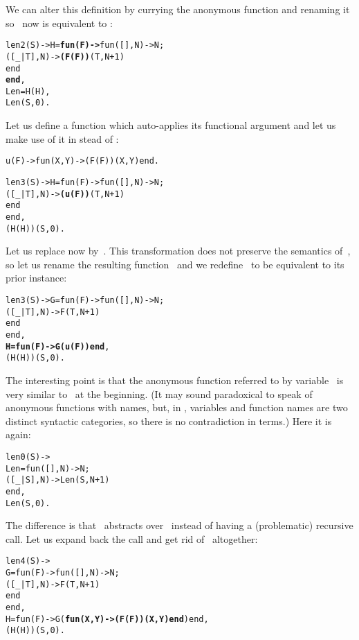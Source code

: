 We can alter this definition by currying the anonymous function and
renaming it so ~now is equivalent to :
\begin{alltt}
len2(S) -> H = \textbf{fun(F) ->} fun(   [],N) -> N;
                            ([\_|T],N) -> \textbf{(F(F))}(T,N+1)
                         end
               \textbf{end},
           Len = H(H),\hfill% \emph{Equivalent to} fun len/2
           Len(S,0).
\end{alltt}
Let us define a function  which auto\hyp{}applies its
functional argument and let us make use of it in stead of
:
\begin{alltt}
u(F) -> fun(X,Y) -> (F(F))(X,Y) end.\hfill% \emph{Self\hyp{}application}

len3(S) -> H = fun(F) -> fun(   [],N) -> N;
                            ([\_|T],N) -> \textbf{(u(F))}(T,N+1)
                         end
               end,
           (H(H))(S,0).\hfill% \emph{Expanded} Len
\end{alltt}
Let us replace now  by~. This transformation
does not preserve the semantics of~, so let us rename the
resulting function~ and we redefine~ to be
equivalent to its prior instance:
\begin{alltt}
len3(S) -> G = fun(F) -> fun(   [],N) -> N;
                            ([\_|T],N) -> F(T,N+1)
                         end
               end,
           \textbf{H = fun(F) -> G(u(F)) end},
           (H(H))(S,0).
\end{alltt}
The interesting point is that the anonymous function referred to by
variable~ is very similar to~ at the
beginning. (It may sound paradoxical to speak of anonymous functions
with names, but, in \Erlang, variables and function names are two
distinct syntactic categories, so there is no contradiction in terms.)
Here it is again:
\begin{alltt}
len0(S) ->
  Len = fun(   [],N) -> N;
           ([\_|S],N) -> Len(S,N+1)\hfill% \emph{Unfortunately invalid}
        end,
  Len(S,0).
\end{alltt}
The difference is that ~abstracts over~ instead
of having a (problematic) recursive call. Let us expand back the call
 and get rid of~ altogether:
\begin{alltt}
len4(S) ->
  G = fun(F) -> fun(   [],N) -> N;
                   ([\_|T],N) -> F(T,N+1)
                end
      end,
  H = fun(F) -> G(\textbf{fun(X,Y) -> (F(F))(X,Y) end}) end,
  (H(H))(S,0).
\end{alltt}
